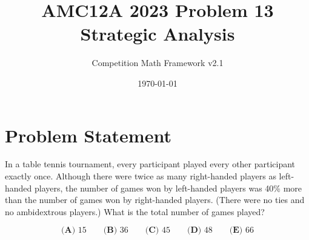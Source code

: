 \documentclass[12pt]{article}
\begin{document}
\title{AMC12A 2023 Problem 13\\Strategic Analysis}
\author{Competition Math Framework v2.1}
\date{\today}
\maketitle

\section*{Problem Statement}

In a table tennis tournament, every participant played every other participant exactly once. Although there were twice as many right-handed players as left-handed players, the number of games won by left-handed players was 40\% more than the number of games won by right-handed players. (There were no ties and no ambidextrous players.) What is the total number of games played?

$$\textbf{(A) }15\qquad\textbf{(B) }36\qquad\textbf{(C) }45\qquad\textbf{(D) }48\qquad\textbf{(E) }66$$
\end{document}
